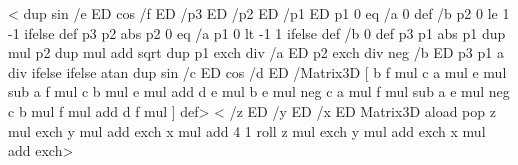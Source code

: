 %
<%
  dup sin /e ED cos /f ED
  /p3 ED /p2 ED /p1 ED
  p1 0 eq
  { /a 0 def /b p2 0 le { 1 } { -1 } ifelse def
    p3 p2 abs
  }
  { p2 0 eq
    { /a p1 0 lt { -1 } { 1 } ifelse def /b 0 def
      p3 p1 abs
    }
    { p1 dup mul p2 dup mul add sqrt dup
      p1 exch div /a ED
      p2 exch div neg /b ED
      p3 p1 a div
    }
    ifelse
  }
  ifelse
  atan dup sin /c ED cos /d ED
  /Matrix3D
  [
    b f mul c a mul e mul sub
    a f mul c b mul e mul add
    d e mul
    b e mul neg c a mul f mul sub
    a e mul neg c b mul f mul add
    d f mul
  ] def>
%
%
<%
  /z ED /y ED /x ED
  Matrix3D aload pop
  z mul exch y mul add exch x mul add
  4 1 roll
  z mul exch y mul add exch x mul add
  exch>
%
